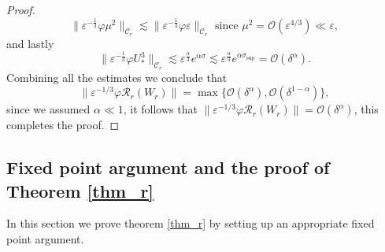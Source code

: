 \documentclass[letterpaper,11pt]{article}
\newcommand{\Ral}{\mathcal{R}}
\newcommand{\rmO}{\mathcal{O}}
\newcommand{\eps}{\varepsilon}
\newcommand{\lar}{ \lesssim }
\numberwithin{equation}{section}
\theoremstyle{plain}
\begin{document}
\begin{proof}
\[
\|\eps^{-\frac{1}{3}}\varphi \mu^2 \|_{\mathcal{C}_r} \lar \|\eps^{-\frac{1}{3}}\varphi \eps \|_{\mathcal{C}_r} \text{ since } \mu^2 = \rmO(\eps^{4/3}) \ll \eps, 
\]
and lastly
\[
\|\eps^{-\frac{1}{3}}\varphi U_*^3\|_{\mathcal{C}_r} \lar \eps^{\frac{\alpha}{3}} e^{\alpha\sigma} \lar \eps^{\frac{\alpha}{3}} e^{\alpha\sigma_{\sup}} = \rmO(\delta^\alpha).
\]
Combining all the estimates we conclude that 
\[
\|\eps^{-1/3}\varphi \Ral_r(W_r) \| = \max\{ \rmO(\delta^\alpha), \rmO(\delta^{1-\alpha})\},
\]
since we assumed $\alpha \ll 1$, it follows that $\|\eps^{-1/3}\varphi \Ral_r(W_r) \| = \rmO(\delta^\alpha)$, this completes the proof.
\end{proof}

\subsection{Fixed point argument and the proof of Theorem \ref{thm_r}}
In this section we prove theorem \ref{thm_r} by setting up an appropriate fixed point argument.
\end{document}
